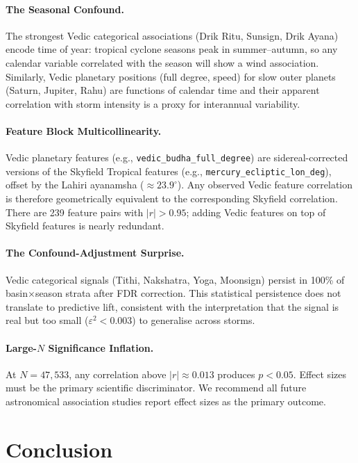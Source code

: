 \documentclass[12pt,a4paper]{article}
\begin{document}
\paragraph{The Seasonal Confound.}
The strongest Vedic categorical associations (Drik Ritu, Sunsign, Drik Ayana)
encode time of year: tropical cyclone seasons peak in summer--autumn, so any
calendar variable correlated with the season will show a wind association.
Similarly, Vedic planetary positions (full degree, speed) for slow outer
planets (Saturn, Jupiter, Rahu) are functions of calendar time and their
apparent correlation with storm intensity is a proxy for interannual
variability.

\paragraph{Feature Block Multicollinearity.}
Vedic planetary features (e.g., \texttt{vedic\_budha\_full\_degree}) are
sidereal-corrected versions of the Skyfield Tropical features
(e.g., \texttt{mercury\_ecliptic\_lon\_deg}), offset by the Lahiri ayanamsha
($\approx 23.9^\circ$). Any observed Vedic feature correlation is therefore
geometrically equivalent to the corresponding Skyfield correlation. There are
239 feature pairs with $|r| > 0.95$; adding Vedic features on top of Skyfield
features is nearly redundant.

\paragraph{The Confound-Adjustment Surprise.}
Vedic categorical signals (Tithi, Nakshatra, Yoga, Moonsign) persist in 100\%
of basin$\times$season strata after FDR correction. This statistical persistence
does not translate to predictive lift, consistent with the interpretation that
the signal is real but too small ($\varepsilon^2 < 0.003$) to generalise
across storms.

\paragraph{Large-$N$ Significance Inflation.}
At $N = 47{,}533$, any correlation above $|r| \approx 0.013$ produces
$p < 0.05$. Effect sizes must be the primary scientific discriminator.
We recommend all future astronomical association studies report effect sizes
as the primary outcome.

\section{Conclusion}
\label{sec:conclusion}
\end{document}
